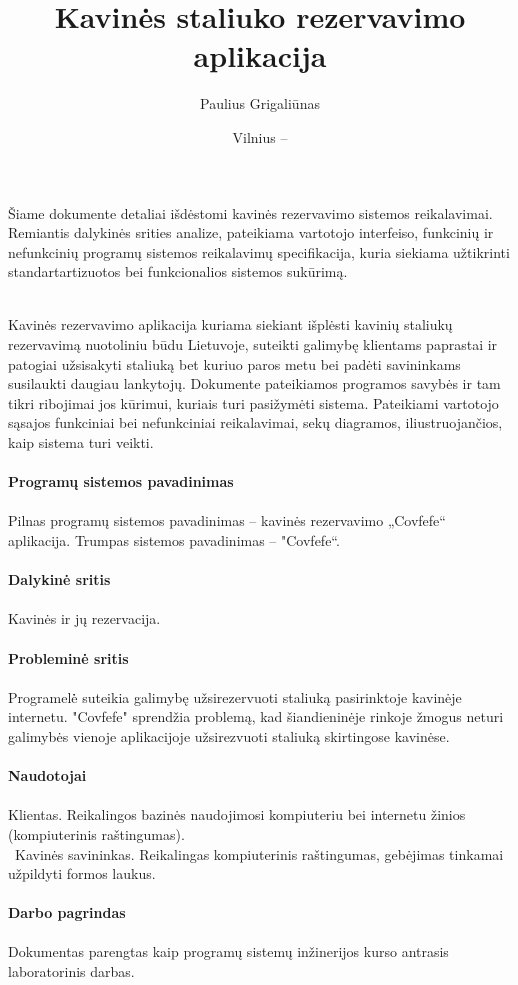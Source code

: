 \documentclass{VUMIFPSkursinis}
\title{Kavinės staliuko rezervavimo aplikacija}
\author{Paulius Grigaliūnas}
\date{Vilnius – \the\year}
\begin{document}
\maketitle
\cleardoublepage{}
\setcounter{page}{2}



\noindent
Šiame dokumente detaliai išdėstomi kavinės rezervavimo sistemos reikalavimai. Remiantis dalykinės srities analize, pateikiama vartotojo interfeiso, funkcinių ir nefunkcinių programų sistemos reikalavimų specifikacija, kuria siekiama užtikrinti standartartizuotos bei funkcionalios sistemos sukūrimą.\\\\




\tableofcontents

\noindent
Kavinės rezervavimo aplikacija kuriama siekiant išplėsti kavinių staliukų rezervavimą nuotoliniu būdu Lietuvoje, suteikti galimybę klientams paprastai ir patogiai užsisakyti staliuką bet kuriuo paros metu bei padėti savininkams susilaukti daugiau lankytojų. 
\newline
Dokumente pateikiamos programos savybės ir tam tikri ribojimai jos kūrimui, kuriais turi pasižymėti sistema. Pateikiami vartotojo sąsajos funkciniai bei nefunkciniai reikalavimai, sekų diagramos, iliustruojančios, kaip sistema turi veikti.\\\\
{\bfseries Programų sistemos pavadinimas}\\\\
Pilnas programų sistemos pavadinimas – kavinės rezervavimo „Covfefe“ aplikacija. Trumpas sistemos pavadinimas – "Covfefe“.\\\\
{\bfseries Dalykinė sritis}\\\\
Kavinės ir jų rezervacija.\\\\
\noindent
{\bfseries Probleminė sritis}\\\\
Programelė̇ suteikia galimybę užsirezervuoti staliuką pasirinktoje kavinėje internetu. "Covfefe" sprendžia problemą, kad šiandieninėje rinkoje žmogus neturi galimybės vienoje aplikacijoje užsirezvuoti staliuką skirtingose kavinėse.\\\\
{\bfseries Naudotojai}\\\\
Klientas. Reikalingos bazinės naudojimosi kompiuteriu bei internetu žinios (kompiuterinis raštingumas).\\\
Kavinės savininkas. Reikalingas kompiuterinis raštingumas, gebėjimas tinkamai užpildyti formos laukus.\\\\
{\bfseries Darbo pagrindas}\\\\
Dokumentas parengtas kaip programų sistemų inžinerijos kurso antrasis laboratorinis darbas.
\newline
\end{document}
